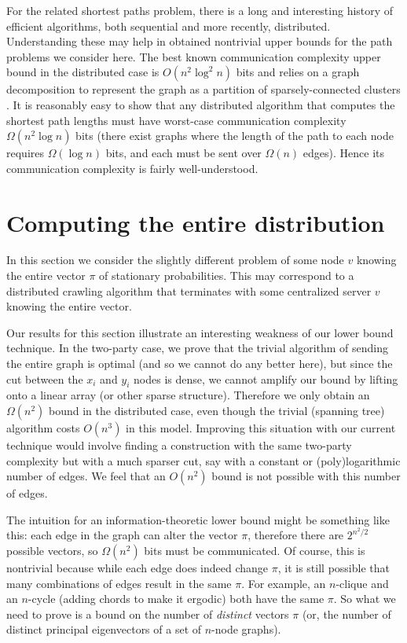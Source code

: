 \documentclass[twocolumn]{article}
\begin{document}
For the related shortest paths problem, there is a long and interesting history of efficient algorithms, both sequential and more recently, distributed. Understanding these may help in obtained nontrivial upper bounds for the path problems we consider here. The best known communication complexity upper bound in the distributed case is $O(n^2 \log^2 n)$ bits and relies on a graph decomposition to represent the graph as a partition of sparsely-connected clusters \cite{afek92sparser}. It is reasonably easy to show that any distributed algorithm that computes the shortest path lengths must have worst-case communication complexity $\Omega(n^2 \log n)$ bits (there exist graphs where the length of the path to each node requires $\Omega(\log n)$ bits, and each must be sent over $\Omega(n)$ edges). Hence its communication complexity is fairly well-understood.

\section{Computing the entire distribution}
\label{section:distribution}

In this section we consider the slightly different problem of some node $v$ knowing the entire vector $\pi$ of stationary probabilities. This may correspond
to a distributed crawling algorithm that terminates with some centralized server $v$ knowing the entire vector.

Our results for this section illustrate an interesting weakness of our
lower bound technique. In the two-party case, we prove that the trivial
algorithm of sending the entire graph is optimal (and so we cannot do
any better here), but since the cut between the $x_i$ and $y_i$ nodes is
dense, we cannot amplify our bound by lifting onto a linear array (or
other sparse structure). Therefore we only obtain an $\Omega(n^2)$ bound
in the distributed case, even though the trivial (spanning tree)
algorithm costs $O(n^3)$ in this model. Improving this situation with
our current technique would involve finding a construction with the same
two-party complexity but with a much sparser cut, say with a constant or
(poly)logarithmic number of edges. We feel that an $O(n^2)$ bound is not
possible with this number of edges.

The intuition for an information-theoretic lower bound might be something like
this: each edge in the graph can alter the vector $\pi$, therefore there are
$2^{n^2/ 2}$ possible vectors, so $\Omega(n^2)$ bits must be communicated. Of
course, this is nontrivial because while each edge does indeed change $\pi$, it
is still possible that many combinations of edges result in the same $\pi$. For
example, an $n$-clique and an $n$-cycle (adding chords to make it ergodic) both
have the same $\pi$. So what we need to prove is a bound on the number of {\em
distinct} vectors $\pi$ (or, the number of distinct principal eigenvectors of a
set of $n$-node graphs).
\end{document}
